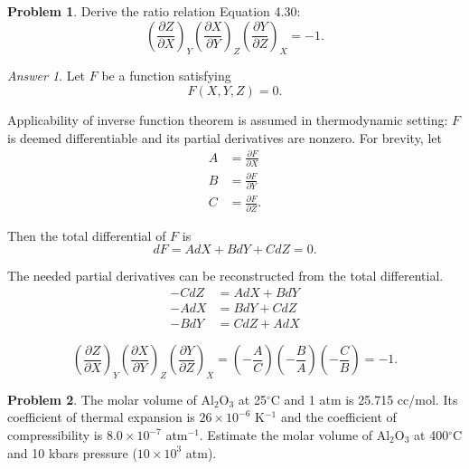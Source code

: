 \documentclass[a4paper, 12pt]{article}
\theoremstyle{definition}
\newtheorem{problem}{Problem}[section]
\theoremstyle{remark}
\newtheorem*{answer}{Answer}
\begin{document}
\begin{problem}
    Derive the ratio relation Equation 4.30:
    \[
        \left( \frac{\partial Z}{\partial X} \right)_Y
        \left( \frac{\partial X}{\partial Y} \right)_Z
        \left( \frac{\partial Y}{\partial Z} \right)_X
        = -1.
    \]
\end{problem}

\begin{answer}
    Let $F$ be a function satisfying
    \[ F(X, Y, Z) = 0.\]

    Applicability of inverse function theorem is assumed in thermodynamic
    setting: $F$ is deemed differentiable and its partial derivatives are
    nonzero.  For brevity, let
    \begin{align*}
        A &= \frac{\partial F}{\partial X} \\
        B &= \frac{\partial F}{\partial Y} \\
        C &= \frac{\partial F}{\partial Z}.
    \end{align*}

    Then the total differential of $F$ is
    \[ dF = AdX + BdY + CdZ = 0.\]

    The needed partial derivatives can be reconstructed from the total
    differential.
    \begin{align*}
        -CdZ &= AdX + BdY \\
        -AdX &= BdY + CdZ \\
        -BdY &= CdZ + AdX
    \end{align*}

    \[
        \left( \frac{\partial Z}{\partial X} \right)_Y
        \left( \frac{\partial X}{\partial Y} \right)_Z
        \left( \frac{\partial Y}{\partial Z} \right)_X
        = \left( -\frac AC \right)
          \left( -\frac BA \right)
          \left( -\frac CB \right)
        = -1.
    \]
\end{answer}

\begin{problem}
    The molar volume of Al$_2$O$_3$ at 25$^\circ$C and 1 atm is 25.715 cc/mol.
    Its coefficient of thermal expansion is $26 \times 10^{-6}$ K$^{-1}$ and
    the coefficient of compressibility is $8.0 \times 10^{-7}$ atm$^{-1}$.
    Estimate the molar volume of Al$_2$O$_3$ at 400$^\circ$C and 10 kbars
    pressure ($10 \times 10^3$ atm).
\end{problem}
\end{document}
